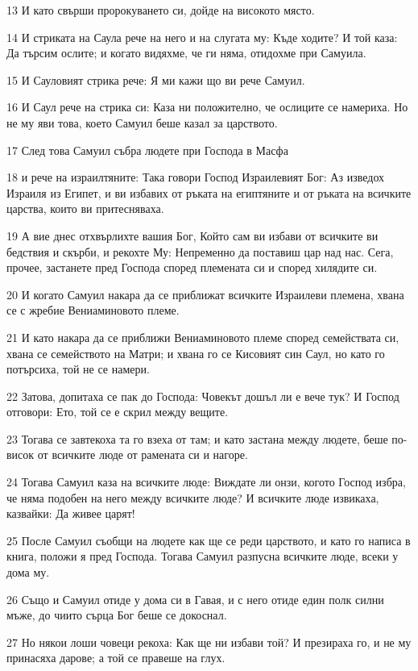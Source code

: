 \par 13 И като свърши пророкуването си, дойде на високото място.
\par 14 И стриката на Саула рече на него и на слугата му: Къде ходите? И той каза: Да търсим ослите; и когато видяхме, че ги няма, отидохме при Самуила.
\par 15 И Сауловият стрика рече: Я ми кажи що ви рече Самуил.
\par 16 И Саул рече на стрика си: Каза ни положително, че ослиците се намериха. Но не му яви това, което Самуил беше казал за царството.
\par 17 След това Самуил събра людете при Господа в Масфа
\par 18 и рече на израилтяните: Така говори Господ Израилевият Бог: Аз изведох Израиля из Египет, и ви избавих от ръката на египтяните и от ръката на всичките царства, които ви притесняваха.
\par 19 А вие днес отхвърлихте вашия Бог, Който сам ви избави от всичките ви бедствия и скърби, и рекохте Му: Непременно да поставиш цар над нас. Сега, прочее, застанете пред Господа според племената си и според хилядите си.
\par 20 И когато Самуил накара да се приближат всичките Израилеви племена, хвана се с жребие Вениаминовото племе.
\par 21 И като накара да се приближи Вениаминовото племе според семействата си, хвана се семейството на Матри; и хвана го се Кисовият син Саул, но като го потърсиха, той не се намери.
\par 22 Затова, допитаха се пак до Господа: Човекът дошъл ли е вече тук? И Господ отговори: Ето, той се е скрил между вещите.
\par 23 Тогава се завтекоха та го взеха от там; и като застана между людете, беше по-висок от всичките люде от рамената си и нагоре.
\par 24 Тогава Самуил каза на всичките люде: Виждате ли онзи, когото Господ избра, че няма подобен на него между всичките люде? И всичките люде извикаха, казвайки: Да живее царят!
\par 25 После Самуил съобщи на людете как ще се реди царството, и като го написа в книга, положи я пред Господа. Тогава Самуил разпусна всичките люде, всеки у дома му.
\par 26 Също и Самуил отиде у дома си в Гавая, и с него отиде един полк силни мъже, до чиито сърца Бог беше се докоснал.
\par 27 Но някои лоши човеци рекоха: Как ще ни избави той? И презираха го, и не му принасяха дарове; а той се правеше на глух.

